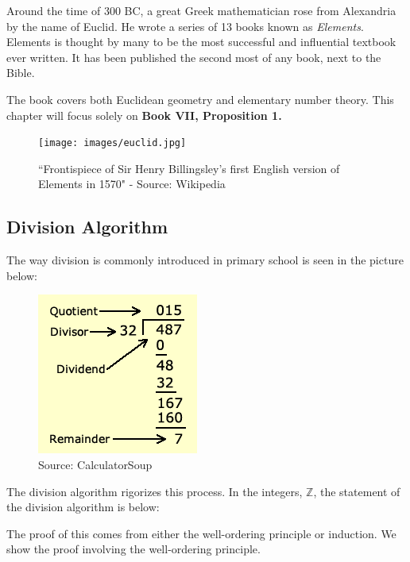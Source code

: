 Around the time of 300 BC, a great Greek mathematician rose from Alexandria by the name of Euclid. He wrote a series of 13 books known as \textit{Elements}. Elements is thought by many to be the most successful and influential textbook ever written. It has been published the second most of any book, next to the Bible. \cite{wiki:el}

The book covers both Euclidean geometry and elementary number theory. This chapter will focus solely on \textbf{Book VII, Proposition 1.}

\clearpage

\begin{figure}[h]
	\centering\texttt{[image: images/euclid.jpg]}
	\caption{``Frontispiece of Sir Henry Billingsley's first English version of Elements in 1570" - Source:  Wikipedia \cite{wiki:el}}
\end{figure}

\clearpage

\subsection{Division Algorithm} 
The way division is commonly introduced in primary school is seen in the picture below:

\begin{figure}[h]
	\centering\includegraphics[width=0.25\linewidth]{images/divisionparts.png}
	\caption{Source:  CalculatorSoup}
\end{figure}

\clearpage

The division algorithm rigorizes this process. In the integers, $\mathbb{Z}$, the statement of the division algorithm is below:


The proof of this comes from either the well-ordering principle or induction. We show the proof involving the well-ordering principle.

